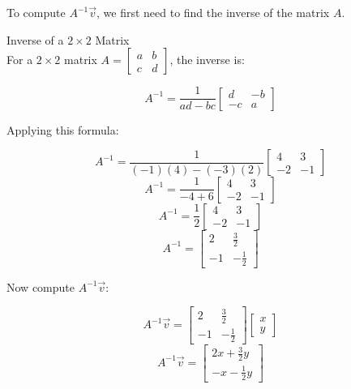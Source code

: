{    %

    To compute $A^{-1} \vec{v}$, we first need to find the inverse of the matrix $A$.


    Inverse of a $2 \times 2$ Matrix \\


    For a $2 \times 2$ matrix $A = \begin{bmatrix} a & b \\ c & d \end{bmatrix}$, the inverse is:

    \[
    A^{-1} = \frac{1}{ad - bc} \begin{bmatrix} d & -b \\ -c & a \end{bmatrix}
    \]

    Applying this formula:

    \[
    A^{-1} = \frac{1}{(-1)(4) - (-3)(2)} \begin{bmatrix} 4 & 3 \\ -2 & -1 \end{bmatrix}
    \]
    \[
    A^{-1} = \frac{1}{-4 + 6} \begin{bmatrix} 4 & 3 \\ -2 & -1 \end{bmatrix}
    \]
    \[
    A^{-1} = \frac{1}{2} \begin{bmatrix} 4 & 3 \\ -2 & -1 \end{bmatrix}
    \]
    \[
    A^{-1} = \begin{bmatrix} 2 & \frac{3}{2} \\ -1 & -\frac{1}{2} \end{bmatrix}
    \]



    Now compute $A^{-1} \vec{v}$:

    \[
    A^{-1} \vec{v} = \begin{bmatrix} 2 & \frac{3}{2} \\ -1 & -\frac{1}{2} \end{bmatrix} \begin{bmatrix} x \\ y \end{bmatrix}
    \]
    \[
    A^{-1} \vec{v} = \begin{bmatrix} 2x + \frac{3}{2}y \\ -x - \frac{1}{2}y \end{bmatrix}
    \]

    
}

